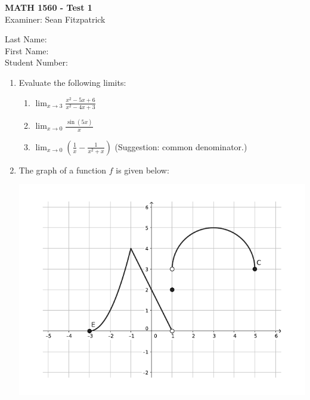 \documentclass[12pt]{article}
\newcommand{\points}[1]{\marginpar{\hspace{24pt}[#1]}}
\newcommand{\skipline}{\vspace{12pt}}
\newcommand{\di}{\displaystyle}
\begin{document}
\thispagestyle{plain}
\begin{center}
{\bf MATH 1560 - Test 1}\\
Examiner: Sean Fitzpatrick
\end{center}
\skipline \skipline \skipline \noindent \skipline
Last Name:\underline{\hspace{350pt}}\\
\skipline
First Name:\underline{\hspace{348pt}}\\
\skipline
Student Number:\underline{\hspace{322pt}}\\
\skipline

\thispagestyle{fancy}

 \begin{enumerate}
 \item  Evaluate the following limits:
\begin{enumerate}
 \item $\di \lim_{x\to 3} \frac{x^2-5x+6}{x^2-4x+3}$ \points{3}

\vspace{2in}

 \item $\di \lim_{x\to 0}\frac{\sin(5x)}{x}$ \points{3}

\vspace{2in}

 \item $\di \lim_{x\to 0}\left(\frac{1}{x}-\frac{1}{x^2+x}\right)$ \points{3} (Suggestion: common denominator.)

\end{enumerate}
\newpage

\item The graph of a function $f$ is given below:

\begin{center}
 \includegraphics[width=5in]{TT1_fig1}
\end{center}


\end{enumerate}
\end{document}
